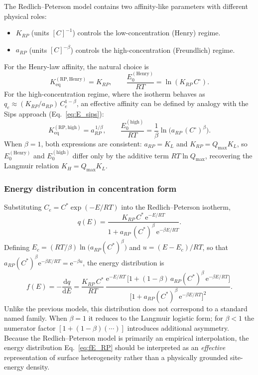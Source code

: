\documentclass[12pt]{article}
\begin{document}
	The Redlich--Peterson model contains two affinity-like parameters with
	different physical roles:
	\begin{itemize}
		\item $K_{RP}$ (units $[C]^{-1}$) controls the low-concentration
		(Henry) regime.
		\item $a_{RP}$ (units $[C]^{-\beta}$) controls the
		high-concentration (Freundlich) regime.
	\end{itemize}
	For the Henry-law affinity, the natural choice is
	\begin{equation}
		K_{\mathrm{eq}}^{\mathrm{(RP,Henry)}} = K_{RP},
		\qquad
		\frac{E_0^{\mathrm{(Henry)}}}{RT}
		= \ln(K_{RP}\,C^\circ).
		\label{eq:E_RP_henry}
	\end{equation}
	For the high-concentration regime, where the isotherm behaves as
	$q_e \approx (K_{RP}/a_{RP})\,C_e^{1-\beta}$, an effective affinity
	can be defined by analogy with the Sips approach
	(Eq.~\eqref{eq:E_sips}):
	\begin{equation}
		K_{\mathrm{eq}}^{\mathrm{(RP,high)}} = a_{RP}^{\,1/\beta},
		\qquad
		\frac{E_0^{\mathrm{(high)}}}{RT}
		= \frac{1}{\beta}
		\ln\!\bigl(a_{RP}\,(C^\circ)^{\beta}\bigr).
		\label{eq:E_RP_high}
	\end{equation}
	When $\beta = 1$, both expressions are consistent: $a_{RP} = K_L$
	and $K_{RP} = Q_{\max}K_L$, so $E_0^{\mathrm{(Henry)}}$ and
	$E_0^{\mathrm{(high)}}$ differ only by the additive term
	$RT\ln Q_{\max}$, recovering the Langmuir relation $K_H = Q_{\max}K_L$.

	\subsubsection{Energy distribution in concentration form}

	Substituting $C_e = C^{\ast}\exp(-E/RT)$ into the Redlich--Peterson
	isotherm,
	\begin{equation}
		q(E)
		= \frac{K_{RP}\,C^{\ast}\,\mathrm{e}^{-E/RT}}
		{1 + a_{RP}\,(C^{\ast})^{\beta}\,
		\mathrm{e}^{-\beta E/RT}}.
		\label{eq:qE_RP}
	\end{equation}
	Defining $E_c = (RT/\beta)\ln\!\bigl(a_{RP}(C^{\ast})^{\beta}\bigr)$
	and $u = (E - E_c)/RT$, so that
	$a_{RP}(C^{\ast})^{\beta}\mathrm{e}^{-\beta E/RT} = \mathrm{e}^{-\beta u}$,
	the energy distribution is
	\begin{equation}
		f(E) = -\frac{\mathrm{d}q}{\mathrm{d}E}
		= \frac{K_{RP}\,C^{\ast}}{RT}\,
		\frac{\mathrm{e}^{-E/RT}\,
		\bigl[1 + (1-\beta)\,a_{RP}(C^{\ast})^{\beta}\,
		\mathrm{e}^{-\beta E/RT}\bigr]}
		{\bigl[1 + a_{RP}(C^{\ast})^{\beta}\,
		\mathrm{e}^{-\beta E/RT}\bigr]^{2}}.
		\label{eq:fE_RP}
	\end{equation}
	Unlike the previous models, this distribution does not correspond to
	a standard named family. When $\beta = 1$ it reduces to the Langmuir
	logistic form; for $\beta < 1$ the numerator factor
	$[1 + (1-\beta)(\cdots)]$ introduces additional asymmetry. Because
	the Redlich--Peterson model is primarily an empirical interpolation,
	the energy distribution Eq.~\eqref{eq:fE_RP} should be interpreted
	as an \emph{effective} representation of surface heterogeneity
	rather than a physically grounded site-energy density.
\end{document}
